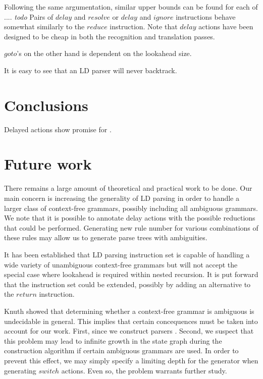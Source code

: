 \documentclass[a4paper,11pt]{article}
\begin{document}
{Following the same argumentation, similar upper bounds can be found for each of .... \emph{todo}
Pairs of $delay$ and $resolve$ or $delay$ and $ignore$ instructions behave somewhat similarly to the $reduce$ instruction. 
Note that $delay$ actions have been designed to be cheap in both the recognition and translation passes. 

$goto$'s on the other hand is dependent on the lookahead size.


It is easy to see that an LD parser will never backtrack.


\section*{Conclusions}

Delayed actions show promise for .

\section*{Future work}

There remains a large amount of theoretical and practical work to be done.
Our main concern is increasing the generality of LD parsing in order to handle a larger class of context-free grammars, possibly including all ambiguous grammars. 
We note that it is possible to annotate delay actions with the possible reductions that could be performed. 
Generating new rule number for various combinations of these rules may allow us to generate parse trees with ambiguities.

It has been established that LD parsing instruction set is capable of handling a wide variety of unambiguous context-free grammars but will not accept the special case where lookahead is required within nested recursion.
It is put forward that the instruction set could be extended, possibly by adding an alternative to the $return$ instruction.

Knuth showed that determining whether a context-free grammar is ambiguous is undecidable in general\cite{knuth65}. 
This implies that certain concequences must be taken into account for our work. First, since we construct parsers .
Second, we suspect that this problem may lead to infinite growth in the state graph during the construction algorithm if certain ambiguous grammars are used.
In order to prevent this effect, we may simply specify a limiting depth for the generator when generating $switch$ actions.
Even so, the problem warrants further study.

}
\end{document}
